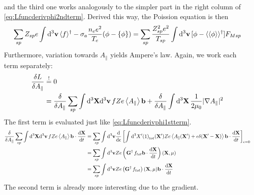 and the third one works analogously to the simpler part in the right column of \eqref{eq:Lfuncderivphi2ndterm}.
Derived this way, the Poission equation is then
\fi
\begin{equation}
\sum_{sp} Z_{sp} e \int {\rm d}^3 {\bf v} \, \langle f \rangle^\dagger -\sigma_a \frac{n_e e^2 }{ T_e} ( \phi - \{ \phi \} ) 
= \sum_{sp} \frac{Z_{sp}^2 e^2}{T_{sp}} \int {\rm d}^3 {\bf v} \, [ \phi - \langle \langle \phi \rangle \rangle^\dagger ] F_{Msp} 
\label{eq:poissonequation}
\end{equation}
Furthermore, variation towards $A_\parallel$ yields Ampere's law. Again, we work each term separately:
\begin{align}
 \frac{\delta L}{\delta A_\parallel} &\overset{!}{=} 0  \\  
&= \frac{\delta}{\delta A_\parallel}
 \sum_{sp} \int {\rm d}^3{\bf X} {\rm d}^3 {\bf v} \, f Ze\left\langle A_\parallel\right\rangle\mathbf{b}
+ \frac{\delta}{\delta A_\parallel}\int {\rm d}^3 {\bf X} \, \frac{1 }{ 2 \mu_0} \vert \nabla A_\parallel \vert^2 
\end{align}
The first term is evaluated just like \eqref{eq:Lfuncderivphi1stterm}.
\begin{align}
   \frac{\delta}{\delta A_\parallel}
 \sum_{sp} \int {\rm d}^3{\bf X} {\rm d}^3 {\bf v} \, f Ze\left\langle A_\parallel\right\rangle\mathbf{b}\cdot\frac{\mathrm{d} \mathbf{X}}{\mathrm{d} t}
&= 
\sum_{sp}\int\mathrm{d}^3\mathbf{v}
\frac{\mathrm{d} }{\mathrm{d} \epsilon}\left[\int\mathrm{d}^3X^\prime {(1)}_{tot}(\mathbf{X}^\prime) Ze\left\langle A_\parallel(\mathbf{X}^\prime) + \epsilon\delta(\mathbf{X}^\prime - \mathbf{X})\right\rangle\mathbf{b}\cdot\frac{\mathrm{d} \mathbf{X}}{\mathrm{d} t}\right]_{\epsilon=0}  \nonumber\\
&= 
\sum_{sp}\int\mathrm{d}^3\mathbf{v}
Ze\left(\mathbf{G}^\dagger\, f_{tot}\mathbf{b}\cdot\frac{\mathrm{d} \mathbf{X}}{\mathrm{d} t}\right)(\mathbf{X},\mu)\\
&= 
\sum_{sp}\int\mathrm{d}^3\mathbf{v}
Ze\left(\mathbf{G}^\dagger\, f_{tot}\right)(\mathbf{X},\mu)\mathbf{b}\cdot\frac{\mathrm{d} \mathbf{X}}{\mathrm{d} t}
\end{align}
The second term is already more interesting due to the gradient.
